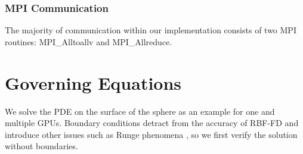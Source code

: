 \subsubsection{MPI Communication} 
The majority of communication within our implementation consists of two MPI routines: MPI\_Alltoallv and MPI\_Allreduce. 


\section{Governing Equations} 

We solve the PDE on the surface of the sphere as an example for one and multiple GPUs. Boundary conditions detract from the accuracy of RBF-FD and introduce other issues such as Runge phenomena \cite{RBFRungePaper}, so we first verify the solution without boundaries. 



